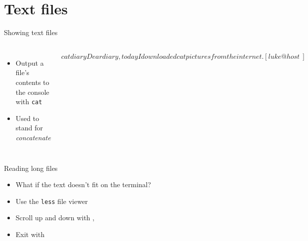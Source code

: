     \section{Text files}

    \begin{frame}[t,fragile]{Showing text files}
        \begin{columns}[T]
            \begin{itemize}
                \item Output a file's contents to the console with
                    \texttt{cat}
                \item Used to stand for \emph{concatenate}
            \end{itemize}
            \begin{bashenv}$ cat diary
Dear diary, today I downloaded
cat pictures from the internet.
[luke@host ~]$
            \end{bashenv}
        \end{columns}
    \end{frame}

    \begin{frame}[t,fragile]{Reading long files}
        \begin{itemize}
            \item What if the text doesn't fit on the terminal?
            \item Use the \texttt{less} file viewer
            \item Scroll up and down with \keys{\arrowkeyup}, \keys{\arrowkeydown}
            \item Exit with 
        \end{itemize}
    \end{frame}

